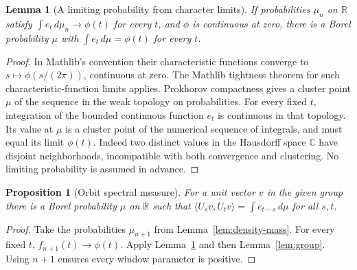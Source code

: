 \documentclass[reqno,a4paper,12pt]{amsart}
\newtheorem{proposition}[theorem]{Proposition}
\newtheorem{lemma}[theorem]{Lemma}
\theoremstyle{definition}
\newcommand{\R}{\mathbb R}
\newcommand{\C}{\mathbb C}
\newcommand{\ip}[2]{\langle #1,#2\rangle}
\begin{document}
\begin{lemma}[A limiting probability from character limits]
\label{lem:character-limit}
If probabilities $\mu_n$ on $\R$ satisfy
$\int e_t\,d\mu_n\to\phi(t)$ for every $t$, and $\phi$ is continuous
at zero, there is a Borel probability $\mu$ with
$\int e_t\,d\mu=\phi(t)$ for every $t$.
\end{lemma}
\begin{proof}
In Mathlib's convention their characteristic functions converge to
$s\mapsto\phi(s/(2\pi))$, continuous at zero.
The Mathlib tightness theorem for such characteristic-function
limits applies. Prokhorov compactness gives a cluster point $\mu$
of the sequence in the weak topology on probabilities.
For every fixed $t$, integration of the bounded continuous function
$e_t$ is continuous in that topology. Its value at $\mu$ is a cluster
point of the numerical sequence of integrals, and must equal its
limit $\phi(t)$. Indeed two distinct values in the Hausdorff space
$\C$ have disjoint neighborhoods, incompatible with both convergence
and clustering. No limiting probability is assumed in advance.
\end{proof}

\begin{proposition}[Orbit spectral measure]\label{prop:orbit-measure}
For a unit vector $v$ in the given group there is a Borel probability
$\mu$ on $\R$ such that
$\ip{U_sv}{U_tv}=\int e_{t-s}\,d\mu$ for all $s,t$.
\end{proposition}
\begin{proof}
Take the probabilities $\mu_{n+1}$ from Lemma~\ref{lem:density-mass}.
For every fixed $t$, $f_{n+1}(t)\to\phi(t)$.
Apply Lemma~\ref{lem:character-limit} and then Lemma~\ref{lem:group}.
Using $n+1$ ensures every window parameter is positive.
\end{proof}
\end{document}
